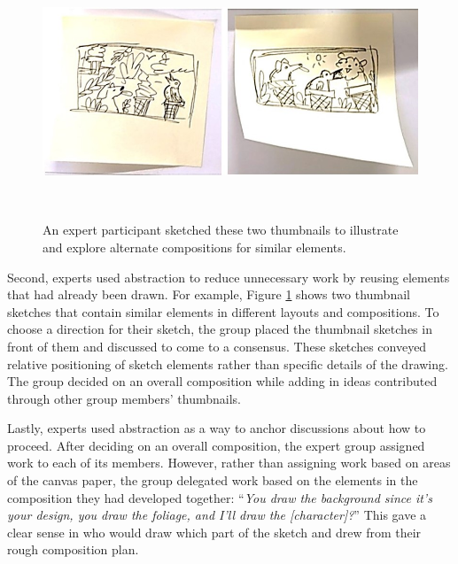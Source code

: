 \begin{figure}
\centering
\includegraphics[width=\textwidth]{abstraction/figures/thumbnails.jpg}
\vspace{-0.2in}
  \caption{An expert participant sketched these two thumbnails to illustrate and explore alternate compositions for similar elements.}
  ~\label{fig:thumbnail}
  \vspace{-0.2in}
\end{figure}

Second, experts used abstraction to reduce unnecessary work by reusing elements that had already been drawn. For example, Figure \ref{fig:thumbnail} shows two thumbnail sketches that contain similar elements in different layouts and compositions. To choose a direction for their sketch, the group placed the thumbnail sketches in front of them and discussed to come to a consensus. These sketches conveyed relative positioning of sketch elements rather than specific details of the drawing. The group decided on an overall composition while adding in ideas contributed through other group members' thumbnails.

Lastly, experts used abstraction as a way to anchor discussions about how to proceed.
After deciding on an overall composition, the expert group  assigned work to each of its members. However, rather than assigning work based on areas of the canvas paper, the group delegated work based on the elements in the composition they had developed together: ``\textit{You draw the background since it's your design, you draw the foliage, and I'll draw the [character]?}'' This gave a clear sense in who would draw which part of the sketch and drew from their rough composition plan. 


